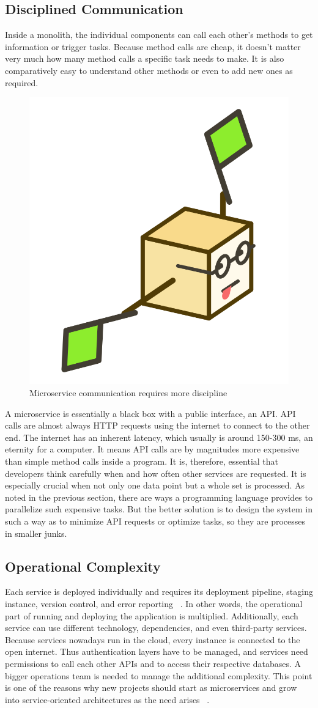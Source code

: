 \subsection{Disciplined Communication}

Inside a monolith, the individual components can call each other's methods to get information or trigger tasks. Because method calls are cheap, it doesn't matter very much how many method calls a specific task needs to make. It is also comparatively easy to understand other methods or even to add new ones as required.

\begin{figure}[ht]
  \centering
  \includegraphics[width=0.25\linewidth]{assets/illustration-microservice-flags.png}
  \caption{Microservice communication requires more discipline}
\end{figure}

A microservice is essentially a black box with a public interface, an API. API calls are almost always HTTP requests using the internet to connect to the other end. The internet has an inherent latency, which usually is around 150-300 ms, an eternity for a computer. It means API calls are by magnitudes more expensive than simple method calls inside a program. It is, therefore, essential that developers think carefully when and how often other services are requested. It is especially crucial when not only one data point but a whole set is processed. As noted in the previous section, there are ways a programming language provides to parallelize such expensive tasks. But the better solution is to design the system in such a way as to minimize API requests or optimize tasks, so they are processes in smaller junks.


\subsection{Operational Complexity}

Each service is deployed individually and requires its deployment pipeline, staging instance, version control, and error reporting ~\cite{fachat.2019.1}. In other words, the operational part of running and deploying the application is multiplied. Additionally, each service can use different technology, dependencies, and even third-party services. Because services nowadays run in the cloud, every instance is connected to the open internet. Thus authentication layers have to be managed, and services need permissions to call each other APIs and to access their respective databases. A bigger operations team is needed to manage the additional complexity. This point is one of the reasons why new projects should start as microservices and grow into service-oriented architectures as the need arises ~\cite{krivtsov.2019}.

